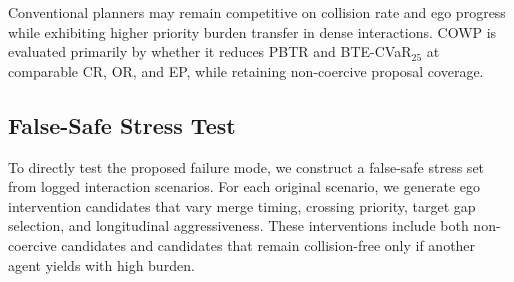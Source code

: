 \documentclass[10pt]{article}
\begin{document}
\begin{table}[t]
\centering
\caption{Closed-loop planning performance on interaction-heavy scenarios. Standard safety is reported with CR/OR; PBTR is the primary mechanism metric. OPR and NCF-Ret must be interpreted jointly with EP.}
\label{tab:main_results}
\end{table}

Conventional planners may remain competitive on collision rate and ego progress while exhibiting higher priority burden transfer in dense interactions. COWP is evaluated primarily by whether it reduces PBTR and BTE-CVaR$_{25}$ at comparable CR, OR, and EP, while retaining non-coercive proposal coverage.

\subsection{False-Safe Stress Test}
\label{sec:false_safe_stress}

To directly test the proposed failure mode, we construct a false-safe stress set from logged interaction scenarios. For each original scenario, we generate ego intervention candidates that vary merge timing, crossing priority, target gap selection, and longitudinal aggressiveness. These interventions include both non-coercive candidates and candidates that remain collision-free only if another agent yields with high burden.
\end{document}
